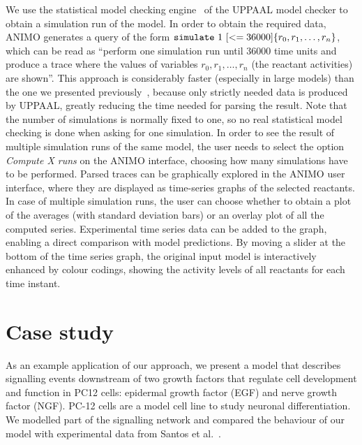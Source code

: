 \documentclass[journal, 10pt]{IEEEtran}
\begin{document}
We use the statistical model checking engine~\cite{uppaal-smc} of the UPPAAL model checker to obtain a simulation run of the model. 
In order to obtain the required data, ANIMO generates a query of the form ${\tt simulate}\ 1\ [<=36000] \{ r_0, r_1, \dots, r_n \}$, 
which can be read as ``perform one simulation run until 36000 time units and produce a trace where the values of 
variables $r_0, r_1, \dots, r_n$ (the reactant activities) are shown''. This approach is considerably faster (especially in large models) 
than the one we presented previously~\cite{animo-bibe}, because only strictly needed data is produced by UPPAAL, greatly 
reducing the time needed for parsing the result. Note that the number of simulations is normally fixed to one, so 
no real statistical model checking is done when asking for one simulation. In order to see the result of multiple 
simulation runs of the same model, the user needs to select the option \emph{Compute X runs} on the ANIMO interface, 
choosing how many simulations have to be performed.
Parsed traces can be graphically explored in the ANIMO user interface, where they are displayed as time-series graphs 
of the selected reactants. In case of multiple simulation runs, the user can choose whether to obtain a plot of the averages 
(with standard deviation bars) or an overlay plot of all the computed series.
Experimental time series data can be added to the graph, enabling a direct comparison with model predictions.
By moving a slider at the bottom of the time series graph, the original input model is interactively enhanced by 
colour codings, showing the activity levels of all reactants for each time instant.

   


\section{Case study}\label{sec:case-study}
As an example application of our approach, we present a model that describes signalling events
downstream of two growth factors that regulate cell development and function in PC12 cells:
epidermal growth factor (EGF) and nerve growth factor (NGF). PC-12 cells are a model cell line to study neuronal differentiation.
We modelled part of the signalling network and compared the behaviour of our model with experimental data from Santos et al.~\cite{egf-ngf}.
\end{document}

